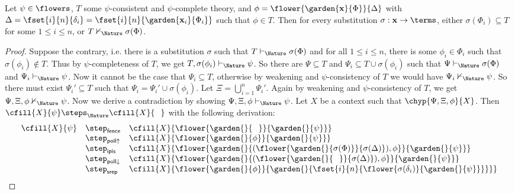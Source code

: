 \begin{proposition}\label{thm:inv-elem-flower}
  
  Let $\psi \in \flowers$, $T$ some $\psi$-consistent and $\psi$-complete
  theory, and $\phi = \flower{\garden{\mathbf{x}}{\Phi}}{\Delta}$ with $\Delta
  = \fset{i}{n}{\delta_i} = \fset{i}{n}{\garden{\mathbf{x}_i}{\Phi_i}}$ such
  that $\phi \in T$. Then for every substitution $\sigma : \mathbf{x} \to
  \terms$, either $\sigma(\Phi_i) \subseteq T$ for some $1 \leq i \leq n$, or $T
  \nvdash_\Nature \sigma(\Phi)$.
\end{proposition}
\begin{proof}
  Suppose the contrary, i.e. there is a substitution $\sigma$ such that $T
  \vdash_\Nature \sigma(\Phi)$ and for all $1 \leq i \leq n$, there is some $\phi_i \in
  \Phi_i$ such that $\sigma(\phi_i) \not\in T$. Thus by $\psi$-completeness of
  $T$, we get $T, \sigma(\phi_i) \vdash_\Nature \psi$. So there are $\Psi \subseteq T$
  and $\Psi_i \subseteq T \cup \sigma(\phi_i)$ such that $\Psi \vdash_\Nature
  \sigma(\Phi)$ and $\Psi_i \vdash_\Nature \psi$. Now it cannot be the case that $\Psi_i
  \subseteq T$, otherwise by weakening and $\psi$-consistency of $T$ we would
  have $\Psi_i \nvdash_\Nature \psi$. So there must exist $\Psi_i' \subseteq T$ such
  that $\Psi_i = \Psi_i' \cup \sigma(\phi_i)$. Let $\Xi = \bigcup_{i =
  1}^{n}{\Psi_i'}$. Again by weakening and $\psi$-consistency of $T$, we get
  $\Psi, \Xi, \phi \nvdash_\Nature \psi$. Now we derive a contradiction by showing
  $\Psi, \Xi, \phi \vdash_\Nature \psi$. Let $X$ be a context such that $\chyp{\Psi,
  \Xi, \phi}{X}$. Then $\cfill{X}{\psi} \steps_\Nature \cfill{X}{\phantom{\Phi}}$ with the following
  derivation:
  $$
  \begin{array}{rll}
    \cfill{X}{\psi}
    &\step_{\mathsf{fence}} &\cfill{X}{\flower{\garden{{}}{\phantom{\Phi}}}{\garden{{}}{\psi}}} \\
    &\step_{\mathsf{poll{\uparrow}}} &\cfill{X}{\flower{\garden{{}}{\phi}}{\garden{{}}{\psi}}} \\
    &\step_{\mathsf{ipis}} &\cfill{X}{\flower{\garden{{}}{(\flower{\garden{}{\sigma(\Phi)}}{\sigma(\Delta)}), \phi}}{\garden{{}}{\psi}}} \\
    &\step_{\mathsf{poll{\downarrow}}} &\cfill{X}{\flower{\garden{{}}{(\flower{\garden{}{\phantom{\Phi}}}{\sigma(\Delta)}), \phi}}{\garden{{}}{\psi}}} \\
    &\step_{\mathsf{srep}} &\cfill{X}{\flower{\garden{{}}{\phi}}{\garden{{}}{\fset{i}{n}{\flower{\sigma(\delta_i)}{\garden{{}}{\psi}}}}}} \\

\end{array}$$
\end{proof}
